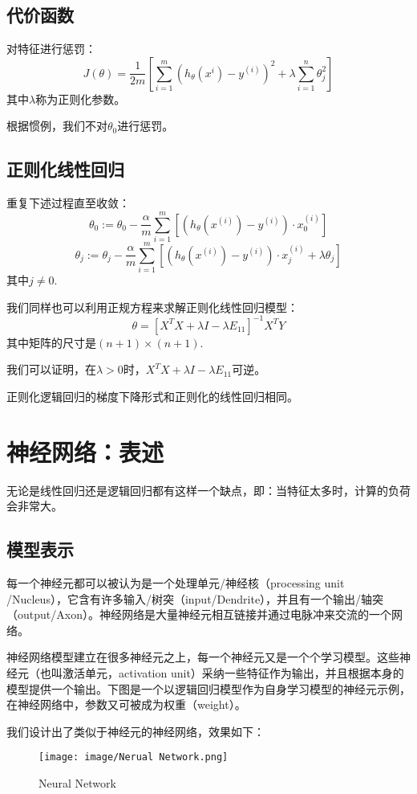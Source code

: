 \documentclass[cn,hazy,blue,normal,14pt]{elegantnote}
\begin{document}
\subsection{代价函数}
对特征进行惩罚：
$$
J(\theta)=\frac{1}{2m}[\sum_{i=1}^{m}(h_\theta(x ^{i})-y ^{(i)})^2+\lambda \sum_{i=1}^{n} \theta_j^2]
$$
其中$\lambda$称为正则化参数。

\begin{note}
根据惯例，我们不对$\theta_0$进行惩罚。
\end{note}
\subsection{正则化线性回归}
重复下述过程直至收敛：
$$
\theta_0:=\theta_0-\frac{\alpha}{m}\sum_{i=1}^{m}[(h_\theta(x ^{(i)})-y ^{(i)})\cdot x_0^{(i)}]
$$
$$
\theta_j:=\theta_j-\frac{\alpha}{m}\sum_{i=1}^{m}[(h_\theta(x ^{(i)})-y ^{(i)})\cdot x_j^{(i)}+\lambda\theta_j]
$$
其中$j\neq 0$.

我们同样也可以利用正规方程来求解正则化线性回归模型：
$$
\theta=\left[X^TX+\lambda I-\lambda E_{11}\right]^{-1}X^TY
$$
其中矩阵的尺寸是$(n+1)\times(n+1)$.
\begin{note}[1]
我们可以证明，在$\lambda>0$时，$X^TX+\lambda I-\lambda E_{11}$可逆。
\end{note}
\begin{note}[2]
正则化逻辑回归的梯度下降形式和正则化的线性回归相同。
\end{note}
\section{神经网络：表述}
无论是线性回归还是逻辑回归都有这样一个缺点，即：当特征太多时，计算的负荷会非常大。
\subsection{模型表示}
每一个神经元都可以被认为是一个处理单元/神经核（processing unit\\/Nucleus），它含有许多输入/树突（input/Dendrite），并且有一个输出/轴突（output/Axon）。神经网络是大量神经元相互链接并通过电脉冲来交流的一个网络。

神经网络模型建立在很多神经元之上，每一个神经元又是一个个学习模型。这些神经元（也叫激活单元，activation unit）采纳一些特征作为输出，并且根据本身的模型提供一个输出。下图是一个以逻辑回归模型作为自身学习模型的神经元示例，在神经网络中，参数又可被成为权重（weight）。

我们设计出了类似于神经元的神经网络，效果如下：
\begin{figure}[h]
    \centering
    \texttt{[image: image/Nerual Network.png]}
    \caption{Neural Network}
\end{figure}
\end{document}
